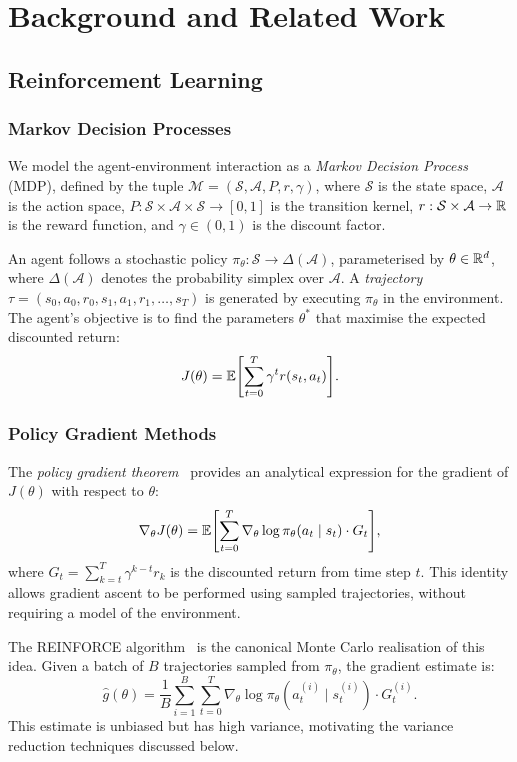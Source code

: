 
\chapter{Background and Related Work}\label{ch:background}

\section{Reinforcement Learning}

\subsection{Markov Decision Processes}

We model the agent-environment interaction as a \emph{Markov Decision Process}
(MDP), defined by the tuple $\mathcal{M} = (\mathcal{S}, \mathcal{A}, P, r, \gamma)$,
where $\mathcal{S}$ is the state space, $\mathcal{A}$ is the action space,
$P: \mathcal{S} \times \mathcal{A} \times \mathcal{S} \to [0,1]$ is the
transition kernel, $r: \mathcal{S} \times \mathcal{A} \to \mathbb{R}$ is the reward
function, and $\gamma \in (0,1)$ is the discount factor.

An agent follows a stochastic policy $\pi_\theta: \mathcal{S} \to
\Delta(\mathcal{A})$, parameterised by $\theta \in \mathbb{R}^d$, where
$\Delta(\mathcal{A})$ denotes the probability simplex over $\mathcal{A}$.
A \emph{trajectory} $\tau = (s_0, a_0, r_0, s_1, a_1, r_1, \ldots, s_T)$ is
generated by executing $\pi_\theta$ in the environment. The agent's objective
is to find the parameters $\theta^*$ that maximise the expected discounted
return:
\[
    J(\theta) = \E*{\sum_{t=0}^{T} \gamma^t r(s_t, a_t)}.
\]

\subsection{Policy Gradient Methods}

The \emph{policy gradient theorem}~\cite{sutton2000policy} provides an
analytical expression for the gradient of $J(\theta)$ with respect to $\theta$:
\[
    \nabla_\theta J(\theta)
    = \E*{\sum_{t=0}^{T} \nabla_\theta \log \pi_\theta(a_t \mid s_t) \cdot G_t},
\]
where $G_t = \sum_{k=t}^{T} \gamma^{k-t} r_k$ is the discounted return from
time step $t$. This identity allows gradient ascent to be performed using
sampled trajectories, without requiring a model of the environment.

The REINFORCE algorithm~\cite{williams1992reinforce} is the canonical Monte
Carlo realisation of this idea. Given a batch of $B$ trajectories sampled from
$\pi_\theta$, the gradient estimate is:
\[
    \hat{g}(\theta) = \frac{1}{B} \sum_{i=1}^{B} \sum_{t=0}^{T}
    \nabla_\theta \log \pi_\theta(a_t^{(i)} \mid s_t^{(i)}) \cdot G_t^{(i)}.
\]
This estimate is unbiased but has high variance, motivating the variance
reduction techniques discussed below.

